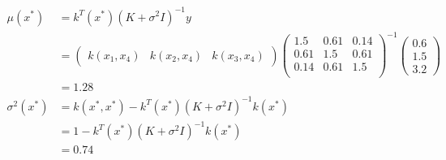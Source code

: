 \documentclass[12pt, a4paper]{article}
\begin{document}
\begin{align*}
    \mu(x^*)&=k^T(x^*)(K+\sigma^2I)^{-1}y\\
    &=\begin{pmatrix}
        k(x_1,x_4)&k(x_2,x_4)&k(x_3,x_4)
    \end{pmatrix}
    \begin{pmatrix}
        1.5 & 0.61 & 0.14 \\
        0.61 & 1.5 & 0.61 \\
        0.14 & 0.61 & 1.5\\
    \end{pmatrix}^{-1}
    \begin{pmatrix}
        0.6\\ 1.5\\ 3.2
    \end{pmatrix}\\
    &=1.28\\
    \sigma^2(x^*)&=k(x^*,x^*)-k^T(x^*)(K+\sigma^2I)^{-1}k(x^*)\\
    &=1-k^T(x^*)(K+\sigma^2I)^{-1}k(x^*)\\
    &=0.74
\end{align*}
\end{document}

